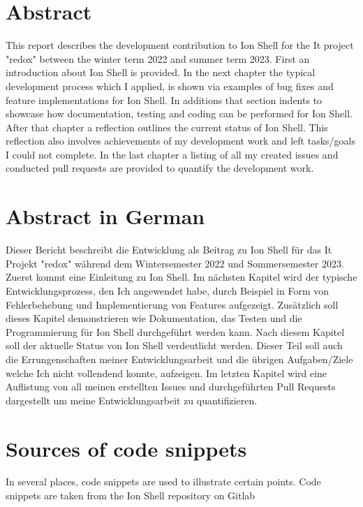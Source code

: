 \thispagestyle{empty}

\section{Abstract}

This report describes the development contribution to Ion Shell for the It project "redox"
between the winter term 2022 and summer term 2023.
First an introduction about Ion Shell is provided.
In the next chapter the typical development process which I applied, is shown
via examples of bug fixes and feature implementations for Ion Shell.
In additions that section indents to showcase how documentation, testing and coding can be performed for Ion Shell.
After that chapter a reflection outlines the current status of Ion Shell.
This reflection also involves achievements of my development work and left tasks/goals I could not complete.
In the last chapter a listing of all my created issues and conducted pull requests are provided to quantify the development work.

\section{Abstract in German}

Dieser Bericht beschreibt die Entwicklung als Beitrag zu Ion Shell für das It Projekt "redox"
während dem Wintersemester 2022 und Sommersemester 2023.
Zuerst kommt eine Einleitung zu Ion Shell.
Im nächsten Kapitel wird der typische Entwicklungsprozess, den Ich angewendet habe,
durch Beispiel in Form von Fehlerbehebung und Implementierung von Features aufgezeigt.
Zusätzlich soll dieses Kapitel demonstrieren wie Dokumentation, das Testen und die Programmierung für Ion Shell durchgeführt werden kann.
Nach diesem Kapitel soll der aktuelle Status von Ion Shell verdeutlicht werden.
Dieser Teil soll auch die Errungenschaften meiner Entwicklungsarbeit und die übrigen Aufgaben/Ziele welche Ich nicht vollendend konnte, aufzeigen.
Im letzten Kapitel wird eine Auflistung von all meinen erstellten Issues und durchgeführten Pull Requests dargestellt um
meine Entwicklungsarbeit zu quantifizieren.

\clearpage

\section{Sources of code snippets}

In several places, code snippets are used to illustrate certain points.
Code snippets are taken from the Ion Shell repository on Gitlab \cite{ion_shell}

